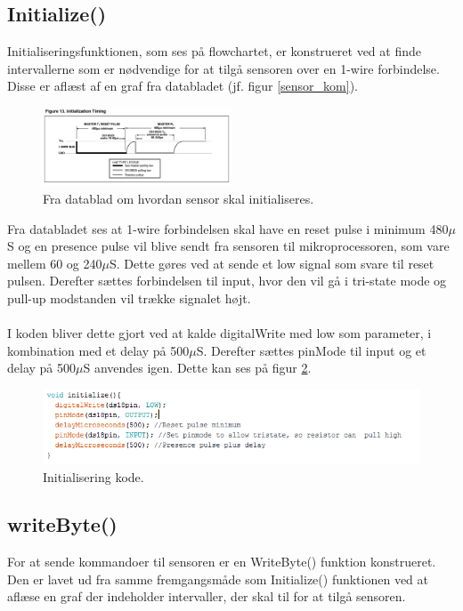 \newpage
\subsection{Initialize()}
Initialiseringsfunktionen, som ses på flowchartet, er konstrueret ved at finde intervallerne som er nødvendige for at tilgå sensoren over en 1-wire forbindelse. Disse er aflæst af en graf fra databladet (jf. figur \ref{sensor_kom}).




\begin{figure}[h!]
  \centering
  \includegraphics[width=0.5\textwidth]{figures/Initialization_timing.png}
  \caption{Fra datablad om hvordan sensor skal initialiseres.}
  \label{sensor_init}
\end{figure}

Fra databladet ses at 1-wire forbindelsen skal have en reset pulse i minimum 480$\mu$S og en presence pulse vil blive sendt fra sensoren til mikroprocessoren, som vare mellem 60 og 240$\mu$S. Dette gøres ved at sende et low signal som svare til reset pulsen. Derefter sættes forbindelsen til input, hvor den vil gå i tri-state mode og pull-up modstanden vil trække signalet højt. 
\\
\\
I koden bliver dette gjort ved at kalde digitalWrite med low som parameter, i kombination med et delay på 500$\mu$S. Derefter sættes pinMode til input og et delay på 500$\mu$S anvendes igen. Dette kan ses på figur \ref{sensor_kode}.

\begin{figure}[h!]
  \centering
  \includegraphics[width=1\textwidth]{figures/Init.png}
  \caption{Initialisering kode.}
  \label{sensor_kode}
\end{figure}


\subsection{writeByte()}
For at sende kommandoer til sensoren er en WriteByte() funktion konstrueret. Den er lavet ud fra samme fremgangsmåde som Initialize() funktionen ved at aflæse en graf der indeholder intervaller, der skal til for at tilgå sensoren.

